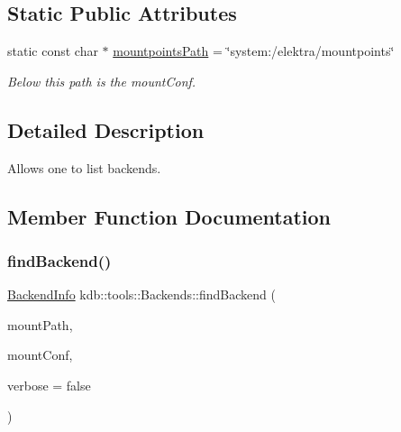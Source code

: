 \subsection*{Static Public Attributes}
\begin{DoxyCompactItemize}
\item 
\mbox{\label{classkdb_1_1tools_1_1Backends_ac867850accaab4fda286f763cacc3926}} 
static const char $\ast$ \hyperlink{classkdb_1_1tools_1_1Backends_ac867850accaab4fda286f763cacc3926}{mountpoints\+Path} = \char`\"{}system\+:/elektra/mountpoints\char`\"{}
\begin{DoxyCompactList}\small\item\em Below this path is the mount\+Conf. \end{DoxyCompactList}\end{DoxyCompactItemize}


\subsection{Detailed Description}
Allows one to list backends. 

\subsection{Member Function Documentation}
\mbox{\label{classkdb_1_1tools_1_1Backends_a692f3f6b5f01ed2e497a6e093e1e2e90}} 
\subsubsection{\texorpdfstring{find\+Backend()}{findBackend()}}
{\footnotesize\ttfamily \hyperlink{structkdb_1_1tools_1_1BackendInfo}{Backend\+Info} kdb\+::tools\+::\+Backends\+::find\+Backend (\begin{DoxyParamCaption}\item[{std\+::string const \&}]{mount\+Path,  }\item[{\hyperlink{classkdb_1_1KeySet}{Key\+Set}}]{mount\+Conf,  }\item[{bool}]{verbose = {\ttfamily false} }\end{DoxyParamCaption})\hspace{0.3cm}{\ttfamily [static]}}



